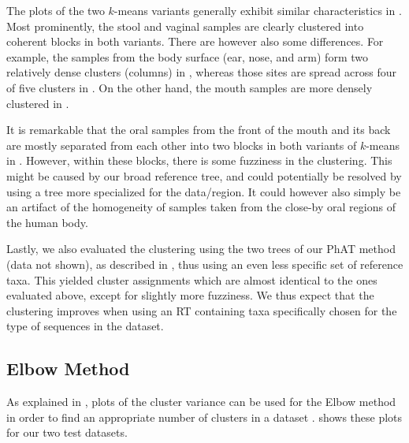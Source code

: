 The plots of the two $k$-means variants generally exhibit similar characteristics in .
Most prominently, the stool and vaginal samples are clearly clustered into coherent blocks in both variants.
There are however also some differences.
For example, the samples from the body surface (ear, nose, and arm)
form two relatively dense clusters (columns) in ,
whereas those sites are spread across four of five clusters in .
On the other hand, the mouth samples are more densely clustered in .

It is remarkable that the oral samples from the front of the mouth and its back
are mostly separated from each other into two blocks in both variants of $k$-means in .
However, within these blocks, there is some fuzziness in the clustering.
This might be caused by our broad reference tree,
and could potentially be resolved by using a tree more specialized for the data/region.
It could however also simply be an artifact of the homogeneity of samples
taken from the close-by oral regions of the human body.

Lastly, we also evaluated the clustering using the two  trees of our \ac{PhAT} method (data not shown),
as described in ,
thus using an even less specific set of reference taxa.
This yielded cluster assignments which are almost identical to the ones evaluated above,
except for slightly more fuzziness.
We thus expect that the clustering improves when using an \ac{RT}
containing taxa specifically chosen for the type of sequences in the dataset.


\subsection{Elbow Method}
\label{ch:Clustering:sec:Results:sub:ElbowMethod}

As explained in ,
plots of the cluster variance can be used for the Elbow method
in order to find an appropriate number of clusters in a dataset \cite{Thorndike1953}.
 shows these plots for our two test datasets.

